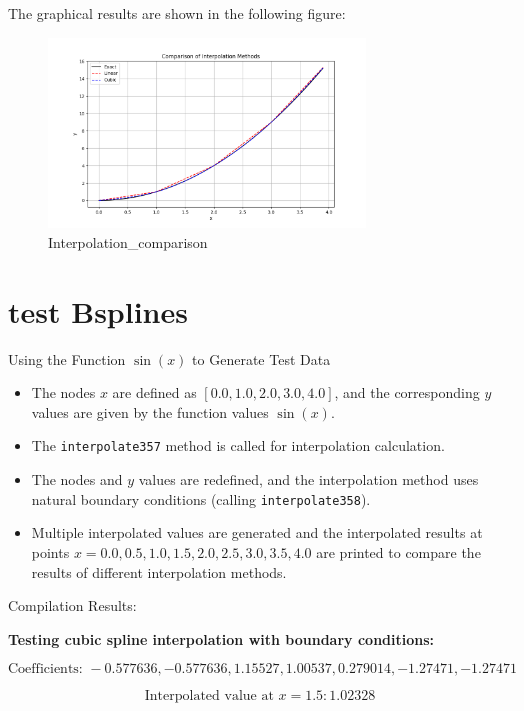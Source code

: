 \documentclass[a4paper]{article}
\begin{document}
The graphical results are shown in the following figure:

\begin{figure}[H]
    \centering
    \includegraphics[width=0.75\textwidth]{figure/interpolation_comparison.png}
    \caption{Interpolation\_comparison}
    \label{fig:interpolation_comparison}
\end{figure}

\section*{test Bsplines}
Using the Function \(\sin(x)\) to Generate Test Data

\begin{itemize}
    \item The nodes \(x\) are defined as \([0.0, 1.0, 2.0, 3.0, 4.0]\), and the corresponding \(y\) values are given by the function values \(\sin(x)\).
    \item The \texttt{interpolate357} method is called for interpolation calculation.
    \item The nodes and \(y\) values are redefined, and the interpolation method uses natural boundary conditions (calling \texttt{interpolate358}).
    \item Multiple interpolated values are generated and the interpolated results at points \(x = 0.0, 0.5, 1.0, 1.5, 2.0, 2.5, 3.0, 3.5, 4.0\) are printed to compare the results of different interpolation methods.
\end{itemize}

Compilation Results:

\textbf{Testing cubic spline interpolation with boundary conditions:}

\[
\text{Coefficients: } -0.577636, -0.577636, 1.15527, 1.00537, 0.279014, -1.27471, -1.27471
\]

\[
\text{Interpolated value at } x = 1.5: 1.02328
\]
\end{document}
